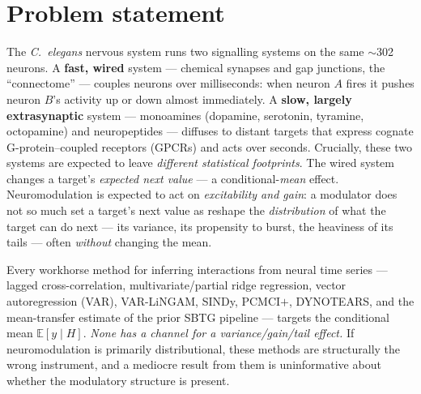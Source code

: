 \documentclass[11pt]{article}
\newcommand{\warnmark}[1]{\textcolor{warn}{\textbf{#1}}}
\newcommand{\E}{\mathbb{E}}
\newcommand{\Hcal}{H}
\begin{document}
\begin{abstract}
$p=0.008$), and an independent estimator (\emph{not} reproduced). We redesign the metric from the
biophysics --- a per-connection expected-timescale, peakedness-aware \emph{band concordance} with a
full control battery, built and adversarially reviewed --- and find that the peptidergic effect
passes the surrogate, source-variance, and structural-dissociation controls, but \warnmark{collapses
when the shared global brain-state mode is removed} ($\Delta$BC $+3.4\!\to\!-0.5$; $p\,0.010\!\to\!
0.69$), and is \warnmark{not reproduced by a null-contrast-tuned neural DSM estimator} ($p=0.88$).
The honest conclusion: the lag signature is specific to the closed-form SID gain operator and
entangled with global brain state --- a well-characterised lead, not a robust directed-coupling
result. What survives is a principled method, a decisive synthetic validation, a corrected pipeline,
an overall-competitive real-data estimator, and a case study in controls-first neuroscience.
\end{abstract}

\tableofcontents
\vspace{1em}

\section{Problem statement}
\label{sec:problem}

The \textit{C.\ elegans} nervous system runs two signalling systems on the same $\sim$302 neurons. A
\textbf{fast, wired} system --- chemical synapses and gap junctions, the ``connectome'' --- couples
neurons over milliseconds: when neuron $A$ fires it pushes neuron $B$'s activity up or down almost
immediately. A \textbf{slow, largely extrasynaptic} system --- monoamines (dopamine, serotonin,
tyramine, octopamine) and neuropeptides --- diffuses to distant targets that express cognate
G-protein--coupled receptors (GPCRs) and acts over seconds. Crucially, these two systems are
expected to leave \emph{different statistical footprints}. The wired system changes a target's
\emph{expected next value} --- a conditional-\emph{mean} effect. Neuromodulation is expected to act
on \emph{excitability and gain}: a modulator does not so much set a target's next value as reshape
the \emph{distribution} of what the target can do next --- its variance, its propensity to burst,
the heaviness of its tails --- often \emph{without} changing the mean.

Every workhorse method for inferring interactions from neural time series --- lagged
cross-correlation, multivariate/partial ridge regression, vector autoregression (VAR), VAR-LiNGAM,
SINDy, PCMCI$+$, DYNOTEARS, and the mean-transfer estimate of the prior SBTG pipeline --- targets the
conditional mean $\E[y\mid \Hcal]$. \emph{None has a channel for a variance/gain/tail effect.} If
neuromodulation is primarily distributional, these methods are structurally the wrong instrument,
and a mediocre result from them is uninformative about whether the modulatory structure is present.
\end{document}
